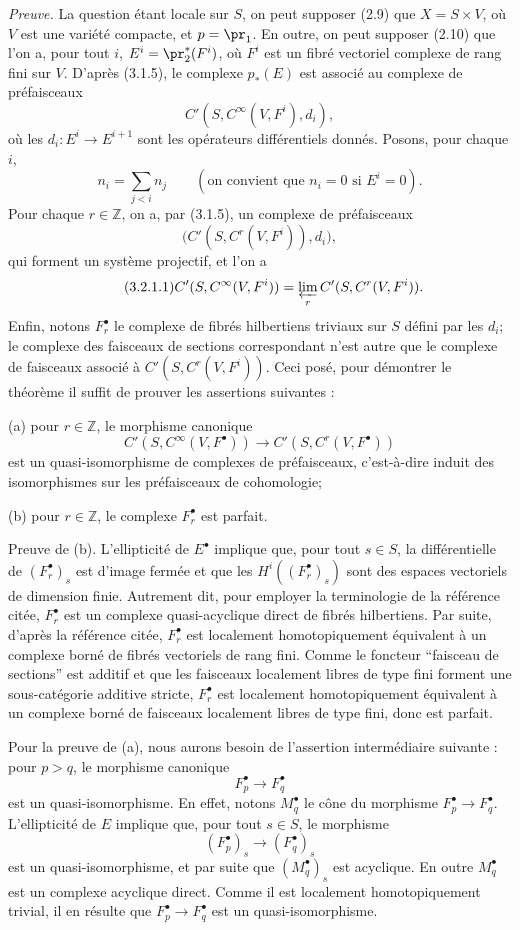 \documentclass[11pt]{article}
\providecommand{\Z}{\mathbb Z}
\begin{document}
\emph{Preuve.} La question étant locale sur $S$, on peut supposer (2.9) que $X=S\times V$, où $V$ est une variété compacte, et $p=\pr_1$. En outre, on peut supposer (2.10) que l'on a, pour tout $i$, $E^i=\pr_2^*(F^i)$, où $F^i$ est un fibré vectoriel complexe de rang fini sur $V$. D'après (3.1.5), le complexe $p_*(E)$ est associé au complexe de préfaisceaux
\[
  C'(S,C^\infty(V,F^i),d_i),
\]
où les $d_i:E^i\to E^{i+1}$ sont les opérateurs différentiels donnés. Posons, pour chaque $i$,
\[
  n_i=\sum_{j<i} n_j
  \qquad (\text{on convient que } n_i=0 \text{ si } E^i=0).
\]
Pour chaque $r\in\Z$, on a, par (3.1.5), un complexe de préfaisceaux
\[
  \bigl(C'(S,C^r(V,F^i)),d_i\bigr),
\]
qui forment un système projectif, et l'on a
\begin{equation}\tag{3.2.1.1}
  C'(S,C^\infty(V,F^i))=\varprojlim_r C'(S,C^r(V,F^i)).
\end{equation}
Enfin, notons $F_r^\bullet$ le complexe de fibrés hilbertiens triviaux sur $S$ défini par les $d_i$; le complexe des faisceaux de sections correspondant n'est autre que le complexe de faisceaux associé à $C'(S,C^r(V,F^i))$. Ceci posé, pour démontrer le théorème il suffit de prouver les assertions suivantes :

(a) pour $r\in\Z$, le morphisme canonique
\[
  C'(S,C^\infty(V,F^\bullet))
  \longrightarrow C'(S,C^r(V,F^\bullet))
\]
est un quasi-isomorphisme de complexes de préfaisceaux, c'est-à-dire induit des isomorphismes sur les préfaisceaux de cohomologie;

(b) pour $r\in\Z$, le complexe $F_r^\bullet$ est parfait.

Preuve de (b). L'ellipticité de $E^\bullet$ implique que, pour tout $s\in S$, la différentielle de $(F_r^\bullet)_s$ est d'image fermée et que les $H^i((F_r^\bullet)_s)$ sont des espaces vectoriels de dimension finie. Autrement dit, pour employer la terminologie de la référence citée, $F_r^\bullet$ est un complexe quasi-acyclique direct de fibrés hilbertiens. Par suite, d'après la référence citée, $F_r^\bullet$ est localement homotopiquement équivalent à un complexe borné de fibrés vectoriels de rang fini. Comme le foncteur ``faisceau de sections'' est additif et que les faisceaux localement libres de type fini forment une sous-catégorie additive stricte, $F_r^\bullet$ est localement homotopiquement équivalent à un complexe borné de faisceaux localement libres de type fini, donc est parfait.

Pour la preuve de (a), nous aurons besoin de l'assertion intermédiaire suivante : pour $p>q$, le morphisme canonique
\[
  F_p^\bullet\longrightarrow F_q^\bullet
\]
est un quasi-isomorphisme. En effet, notons $M_q^\bullet$ le cône du morphisme $F_p^\bullet\to F_q^\bullet$. L'ellipticité de $E$ implique que, pour tout $s\in S$, le morphisme
\[
  (F_p^\bullet)_s\longrightarrow (F_q^\bullet)_s
\]
est un quasi-isomorphisme, et par suite que $(M_q^\bullet)_s$ est acyclique. En outre $M_q^\bullet$ est un complexe acyclique direct. Comme il est localement homotopiquement trivial, il en résulte que $F_p^\bullet\to F_q^\bullet$ est un quasi-isomorphisme.
\end{document}
